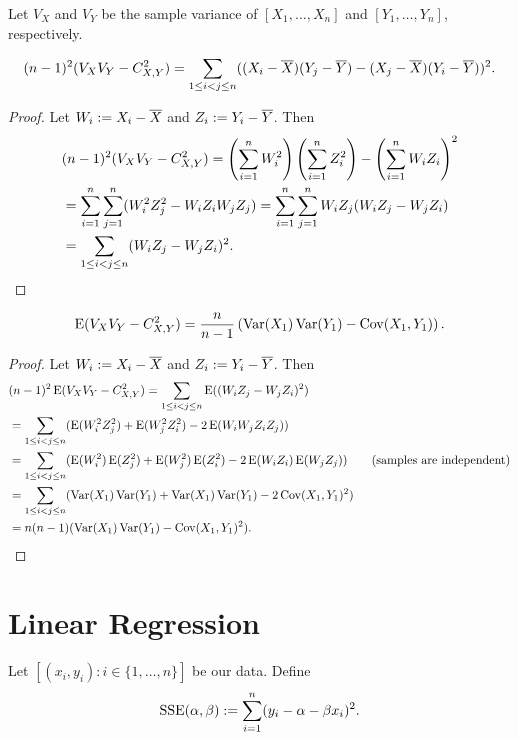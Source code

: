 \documentclass[a4paper, 12pt, fleqn]{article}
\DeclareMathOperator*{\Cov}{Cov}
\newcommand*{\SSE}{\mathrm{SSE}}
\begin{document}
Let $V_X$ and $V_Y$ be the sample variance of $[X_1, \ldots, X_n]$ and $[Y_1, \ldots, Y_n]$, respectively.

\begin{lemma}
\[ (n-1)^2(V_XV_Y - C_{X,Y}^2) = \sum_{1 \le i < j \le n} ((X_i-\overline{X})(Y_j-\overline{Y}) - (X_j-\overline{X})(Y_i-\overline{Y}))^2. \]
\end{lemma}
\begin{proof}
Let $W_i := X_i - \overline{X}$ and $Z_i := Y_i - \overline{Y}$. Then
\begin{align*}
& (n-1)^2(V_XV_Y - C_{X,Y}^2) = \left(\sum_{i=1}^n W_i^2\right)\left(\sum_{i=1}^n Z_i^2\right)
    - \left(\sum_{i=1}^n W_iZ_i\right)^2
\\ &= \sum_{i=1}^n\sum_{j=1}^n (W_i^2 Z_j^2 - W_iZ_iW_jZ_j)
= \sum_{i=1}^n\sum_{j=1}^n W_iZ_j(W_iZ_j - W_jZ_i)
\\ &= \sum_{1 \le i < j \le n} (W_iZ_j - W_jZ_i)^2.
\qedhere
\end{align*}
\end{proof}

\begin{lemma}
\[ \E(V_XV_Y - C_{X,Y}^2) = \frac{n}{n-1}\left(\Var(X_1)\Var(Y_1) - \Cov(X_1, Y_1)\right). \]
\end{lemma}
\begin{proof}
Let $W_i := X_i - \overline{X}$ and $Z_i := Y_i - \overline{Y}$. Then
\begin{align*}
& (n-1)^2\E(V_XV_Y - C_{X,Y}^2) = \sum_{1 \le i < j \le n} \E((W_iZ_j - W_jZ_i)^2)
\\ &= \sum_{1 \le i < j \le n} (\E(W_i^2Z_j^2) + \E(W_j^2Z_i^2) - 2\E(W_iW_jZ_iZ_j))
\\ &= \sum_{1 \le i < j \le n} (\E(W_i^2)\E(Z_j^2) + \E(W_j^2)\E(Z_i^2) - 2\E(W_iZ_i)\E(W_jZ_j))
    \tag{samples are independent}
\\ &= \sum_{1 \le i < j \le n} (\Var(X_1)\Var(Y_1) + \Var(X_1)\Var(Y_1) - 2\Cov(X_1, Y_1)^2)
\\ &= n(n-1) (\Var(X_1)\Var(Y_1) - \Cov(X_1, Y_1)^2).
\qedhere
\end{align*}
\end{proof}

\section{Linear Regression}

Let $[(x_i, y_i): i \in \{1, \ldots, n\}]$ be our data. Define
\[ \SSE(\alpha, \beta) \defeq \sum_{i=1}^n (y_i - \alpha - \beta x_i)^2. \]
\end{document}
